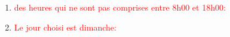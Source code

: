 \documentclass{article}
\begin{document}
\begin{enumerate}
\begin{enumerate}
               \noindent{}
               
          \item \textcolor{red}{des heures qui ne sont pas comprises entre 8h00 et 18h00:}     
 \vspace{0.7cm}
               \hspace*{-0.7in}

               \noindent{} 
          
          
          \vspace{2.7cm}     
               \item \textcolor{red}{Le jour choisi est dimanche:}     
 \vspace{0.7cm}
               \hspace*{-0.7in}


\end{enumerate}
\end{enumerate}
\end{document}
